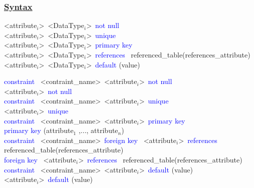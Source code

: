 \subsubsection*{\underline{Syntax}}
\begin{tcolorbox}[title = Inline Constraint]
\textless attribute$_{i}$\textgreater \, \textless DataType$_{i}$\textgreater \, \textcolor{blue}{not null} \\
\textless attribute$_{i}$\textgreater \, \textless DataType$_{i}$\textgreater \, \textcolor{blue}{unique} \\
\textless attribute$_{i}$\textgreater \, \textless DataType$_{i}$\textgreater \, \textcolor{blue}{primary key} \\
\textless attribute$_{i}$\textgreater \, \textless DataType$_{i}$\textgreater \, \textcolor{blue}{references} \, referenced\_table(references\_attribute) \\
\textless attribute$_{i}$\textgreater \, \textless DataType$_{i}$\textgreater \, \textcolor{blue}{default} (value) \\
\end{tcolorbox}

\begin{tcolorbox}[title = Outline Constraint]
\textcolor{blue}{constraint} \, \textless contraint\_name\textgreater \, \textless attribute$_{i}$\textgreater \, \textcolor{blue}{not null} \\
\textless attribute$_{i}$\textgreater \, \textcolor{blue}{not null} \\

\textcolor{blue}{constraint} \, \textless contraint\_name\textgreater \, \textless attribute$_{i}$\textgreater \, \textcolor{blue}{unique} \\
\textless attribute$_{i}$\textgreater \, \textcolor{blue}{unique} \\

\textcolor{blue}{constraint} \, \textless contraint\_name\textgreater \, \textless attribute$_{i}$\textgreater \, \textcolor{blue}{primary key} \\
\textcolor{blue}{primary key} (attribute$_{1}$ ,..., attribute$_{n}$) \\

\textcolor{blue}{constraint} \, \textless contraint\_name\textgreater \, \textcolor{blue}{foreign key} \, \textless attribute$_{i}$\textgreater \, \textcolor{blue}{references} \, referenced\_table(references\_attribute)\\
\textcolor{blue}{foreign key} \, \textless attribute$_{i}$\textgreater \, \textcolor{blue}{references} \, referenced\_table(references\_attribute) \\

\textcolor{blue}{constraint} \, \textless contraint\_name\textgreater \, \textless attribute$_{i}$\textgreater \, \textcolor{blue}{default} (value) \\
\textless attribute$_{i}$\textgreater \, \textcolor{blue}{default} (value) \\

\end{tcolorbox}
